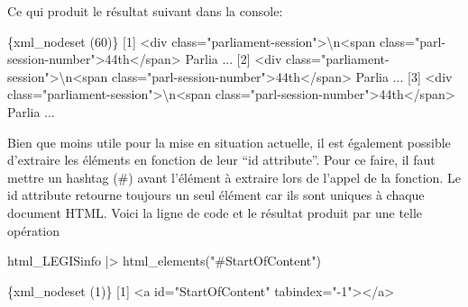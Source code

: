 \documentclass[
  letterpaper,
  DIV=11,
  numbers=noendperiod]{scrreprt}
\newenvironment{Shaded}{\begin{snugshade}}{\end{snugshade}}
\newcommand{\DataTypeTok}[1]{\textcolor[rgb]{0.68,0.00,0.00}{#1}}
\newcommand{\ErrorTok}[1]{\textcolor[rgb]{0.68,0.00,0.00}{#1}}
\newcommand{\ExtensionTok}[1]{\textcolor[rgb]{0.00,0.23,0.31}{#1}}
\newcommand{\KeywordTok}[1]{\textcolor[rgb]{0.00,0.23,0.31}{#1}}
\newcommand{\NormalTok}[1]{\textcolor[rgb]{0.00,0.23,0.31}{#1}}
\newcommand{\OperatorTok}[1]{\textcolor[rgb]{0.37,0.37,0.37}{#1}}
\newcommand{\StringTok}[1]{\textcolor[rgb]{0.13,0.47,0.30}{#1}}
\begin{document}
Ce qui produit le résultat suivant dans la console:

\begin{Shaded}
\begin{Highlighting}[]
\ExtensionTok{\{xml\_nodeset} \ErrorTok{(}\ExtensionTok{60}\KeywordTok{)}\ErrorTok{\}}
 \ExtensionTok{[1]} \OperatorTok{\textless{}}\NormalTok{div class=}\StringTok{"parliament{-}session"}\OperatorTok{\textgreater{}}\DataTypeTok{\textbackslash{}n}\OperatorTok{\textless{}}\NormalTok{span class=}\StringTok{"parl{-}session{-}number"}\OperatorTok{\textgreater{}}\NormalTok{44th}\OperatorTok{\textless{}}\NormalTok{/span}\OperatorTok{\textgreater{}}\NormalTok{ Parlia ...}
 \ExtensionTok{[2]} \OperatorTok{\textless{}}\NormalTok{div class=}\StringTok{"parliament{-}session"}\OperatorTok{\textgreater{}}\DataTypeTok{\textbackslash{}n}\OperatorTok{\textless{}}\NormalTok{span class=}\StringTok{"parl{-}session{-}number"}\OperatorTok{\textgreater{}}\NormalTok{44th}\OperatorTok{\textless{}}\NormalTok{/span}\OperatorTok{\textgreater{}}\NormalTok{ Parlia ...}
 \ExtensionTok{[3]} \OperatorTok{\textless{}}\NormalTok{div class=}\StringTok{"parliament{-}session"}\OperatorTok{\textgreater{}}\DataTypeTok{\textbackslash{}n}\OperatorTok{\textless{}}\NormalTok{span class=}\StringTok{"parl{-}session{-}number"}\OperatorTok{\textgreater{}}\NormalTok{44th}\OperatorTok{\textless{}}\NormalTok{/span}\OperatorTok{\textgreater{}}\NormalTok{ Parlia ...}
\end{Highlighting}
\end{Shaded}

Bien que moins utile pour la mise en situation actuelle, il est
également possible d'extraire les éléments en fonction de leur ``id
attribute''. Pour ce faire, il faut mettre un hashtag (\#) avant
l'élément à extraire lors de l'appel de la fonction. Le id attribute
retourne toujours un seul élément car ils sont uniques à chaque document
HTML. Voici la ligne de code et le résultat produit par une telle
opération

\begin{Shaded}
\begin{Highlighting}[]
\ExtensionTok{html\_LEGISinfo} \KeywordTok{|}\OperatorTok{\textgreater{}}\NormalTok{ html\_elements}\KeywordTok{(}\StringTok{"\#StartOfContent"}\KeywordTok{)}
\end{Highlighting}
\end{Shaded}

\begin{Shaded}
\begin{Highlighting}[]
\ExtensionTok{\{xml\_nodeset} \ErrorTok{(}\ExtensionTok{1}\KeywordTok{)}\ErrorTok{\}}
\ExtensionTok{[1]} \OperatorTok{\textless{}}\NormalTok{a id=}\StringTok{"StartOfContent"}\NormalTok{ tabindex=}\StringTok{"{-}1"}\OperatorTok{\textgreater{}\textless{}}\NormalTok{/a}\OperatorTok{\textgreater{}}
\end{Highlighting}
\end{Shaded}
\end{document}

